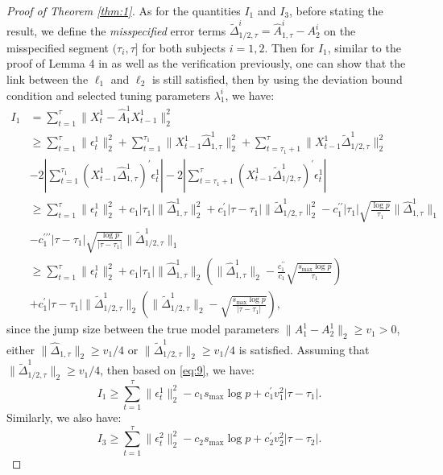 \documentclass[11pt]{article}
\begin{document}
\begin{proof}[Proof of Theorem \ref{thm:1}]
As for the quantities $I_1$ and $I_3$, before stating the result, we define the \emph{misspecified} error terms $\widetilde{\Delta}_{1/2,\tau}^i = \widehat{A}_{1,\tau}^i - A_2^i$ on the misspecified segment $(\tau_i, \tau]$ for both subjects $i=1,2$. Then for $I_1$, similar to the proof of Lemma 4 in \cite{safikhani2020joint} as well as the verification previously, one can show that the link between the $\ell_1$ and $\ell_2$ is still satisfied, then by using the deviation bound condition and selected tuning parameters $\lambda_1^i$, we have: 
\begin{align}
    \label{eq:9}
    I_1
    &= \sum_{t=1}^\tau\|X_t^1 - \widehat{A}_1^1X_{t-1}^1\|_2^2 \nonumber \\
    &\geq \sum_{t=1}^\tau\|\epsilon_t^1\|_2^2 + \sum_{t=1}^{\tau_1}\|X_{t-1}^1\widehat{\Delta}_{1,\tau}^1\|_2^2 + \sum_{t=\tau_1+1}^\tau\|X_{t-1}^1\widetilde{\Delta}_{1/2,\tau}^1\|_2^2 \nonumber \\
    &- 2\left|\sum_{t=1}^{\tau_1}(X_{t-1}^1\widehat{\Delta}_{1,\tau}^1)^\prime \epsilon_t^1\right| - 2\left| \sum_{t=\tau_1+1}^\tau (X_{t-1}^1\widetilde{\Delta}_{1/2,\tau}^1)^\prime \epsilon_t^1 \right| \nonumber \\
    &\geq \sum_{t=1}^\tau\|\epsilon_t^1\|_2^2 + c_1|\tau_1|\|\widehat{\Delta}_{1,\tau}^1\|_2^2 + c_1^\prime|\tau-\tau_1|\|\widetilde{\Delta}_{1/2,\tau}^1\|_2^2 - c_1^{\prime\prime}|\tau_1|\sqrt{\frac{\log p}{\tau_1}}\|\widehat{\Delta}_{1,\tau}^1\|_1 \nonumber \\
    &- c_1^{\prime\prime\prime}|\tau-\tau_1|\sqrt{\frac{\log p}{|\tau-\tau_1|}}\|\widetilde{\Delta}_{1/2,\tau}^1\|_1 \nonumber \\
    &\geq \sum_{t=1}^\tau\|\epsilon_t^1\|_2^2 + c_1|\tau_1|\|\widehat{\Delta}_{1,\tau}^1\|_2\left(\|\widehat{\Delta}_{1,\tau}^1\|_2 - \frac{c_1^{\prime\prime}}{c_1}\sqrt{\frac{s_{\max}\log p}{\tau_1}}\right) \nonumber \\ &+c_1^\prime|\tau-\tau_1|\|\widetilde{\Delta}_{1/2,\tau}^1\|_2\left(\|\widetilde{\Delta}_{1/2,\tau}^1\|_2 - \sqrt{\frac{s_{\max}\log p}{|\tau-\tau_1|}}\right),
\end{align}
since the jump size between the true model parameters $\|A_1^1 - A_2^1\|_2 \geq v_1 > 0$, either $\|\widehat{\Delta}_{1,\tau}\|_2 \geq v_1/4$ or $\|\widetilde{\Delta}_{1/2,\tau}^1\|_2 \geq v_1/4$ is satisfied. Assuming that $\|\widetilde{\Delta}_{1/2,\tau}^1\|_2 \geq v_1/4$, then based on \eqref{eq:9}, we have:
\begin{equation}
    \label{eq:10}
    I_1 \geq \sum_{t=1}^\tau\|\epsilon_t^1\|_2^2 - c_1 s_{\max}\log p + c_1^\prime v_1^2 |\tau-\tau_1|.
\end{equation}
Similarly, we also have:
\begin{equation}
    \label{eq:11}
    I_3 \geq \sum_{t=1}^\tau\|\epsilon_t^2\|_2^2 - c_2 s_{\max}\log p + c_2^\prime v_2^2|\tau-\tau_2|.
\end{equation}


\end{proof}
\end{document}
